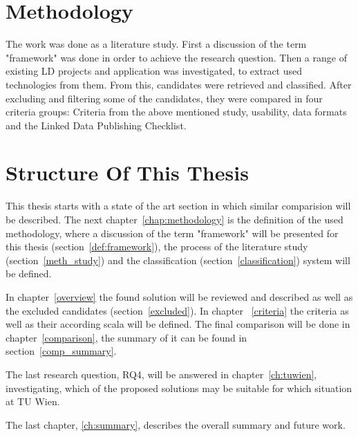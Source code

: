 \section{Methodology}

The work was done as a literature study. First a discussion of the term 
"framework" was done in order to achieve the research question. Then a range of 
existing LD projects and application was investigated, to extract used 
technologies from them. From this, candidates were retrieved and classified. After 
excluding and filtering some of the candidates, they were compared in four 
criteria groups: Criteria from the above mentioned study, usability, data formats 
and the Linked Data Publishing Checklist.

\section{Structure Of This Thesis}
This thesis starts with a state of the art section in which similar comparision 
will be described. The next chapter~\ref{chap:methodology} is the definition of 
the used methodology, where a discussion of the term "framework" will be presented 
for this thesis (section~\ref{def:framework}), the process of the literature study 
(section~\ref{meth_study}) and the classification (section~\ref{classification}) 
system will be defined.

In chapter~\ref{overview} the found solution will be reviewed and described as 
well as the excluded candidates (section~\ref{excluded}). In chapter~
\ref{criteria} the criteria as well as their according scala will be defined. The 
final comparison will be done in chapter~\ref{comparison}, the summary of it can 
be found in section~\ref{comp_summary}.

The last research question, RQ4, will be answered in chapter~\ref{ch:tuwien}, 
investigating, which of the proposed solutions may be suitable for which situation 
at TU Wien.

The last chapter, \ref{ch:summary}, describes the overall summary and future work.